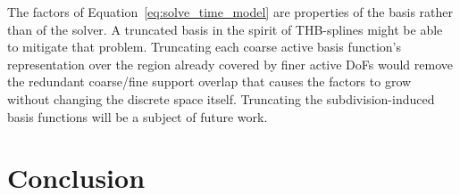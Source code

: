 \documentclass[a4paper, 12pt]{article}
\theoremstyle{definition}
\theoremstyle{plain}
\numberwithin{equation}{section}
\begin{document}
\smallskip

The factors of Equation~\eqref{eq:solve_time_model} are properties of the basis rather than of the solver. A truncated basis in the spirit of THB-splines \citep{Gianelli.2016} might be able to mitigate that problem. Truncating each coarse active basis function's representation over the region already covered by finer active DoFs would remove the redundant coarse/fine support overlap that causes the factors to grow without changing the discrete space itself. Truncating the subdivision-induced basis functions will be a subject of future work.

\FloatBarrier

\section{Conclusion}
\end{document}
